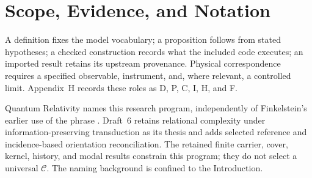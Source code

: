 \section*{Scope, Evidence, and Notation}
A definition fixes the model vocabulary; a proposition follows from stated hypotheses; a checked construction records what the included code executes; an imported result retains its upstream provenance. Physical correspondence requires a specified observable, instrument, and, where relevant, a controlled limit. Appendix~H records these roles as D, P, C, I, H, and F.

Quantum Relativity names this research program, independently of Finkelstein's earlier use of the phrase \citep{finkelstein1996}. Draft~6 retains relational complexity under information-preserving transduction as its thesis and adds selected reference and incidence-based orientation reconciliation. The retained finite carrier, cover, kernel, history, and modal results constrain this program; they do not select a universal $\mathcal C$. The naming background is confined to the Introduction.

